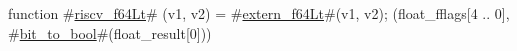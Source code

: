 function #\hyperref[sailRISCVzriscvzyf64Lt]{riscv\_f64Lt}# (v1, v2) = {
  #\hyperref[sailRISCVzexternzyf64Lt]{extern\_f64Lt}#(v1, v2);
  (float_fflags[4 .. 0], #\hyperref[sailRISCVzbitzytozybool]{bit\_to\_bool}#(float_result[0]))
}
